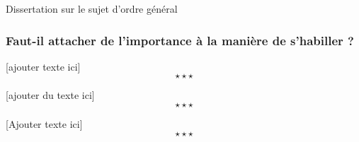 \newpage \begin{bclogo}[barre=none,logo={}]{
		Dissertation sur le sujet d'ordre général
	}
	\begin{center}
		\subsubsection*{Faut-il attacher de l'importance à la manière de s'habiller ?}
		
	\end{center}
\end{bclogo}

[ajouter texte ici] $$\star \star \star$$

[ajouter du texte ici]$$\star \star \star$$

[Ajouter texte ici] $$\star \star \star$$
